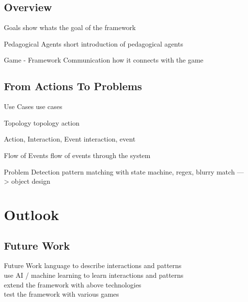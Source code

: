 \documentclass[compress]{beamer}
\begin{document}
\subsection{Overview}

\begin{frame}{Goals}
show whats the goal of the framework
\end{frame}

\begin{frame}{Pedagogical Agents}
short introduction of pedagogical agents
\end{frame}

\begin{frame}{Game - Framework Communication}
how it connects with the game
\end{frame}

\subsection{From Actions To Problems}

\begin{frame}{Use Cases}
use cases
\end{frame}

\begin{frame}{Topology}
topology action
\end{frame}

\begin{frame}{Action, Interaction, Event}
interaction, event
\end{frame}

\begin{frame}{Flow of Events}
flow of events through the system
\end{frame}

\begin{frame}{Problem Detection}
pattern matching with state machine, regex, blurry match ---> object design
\end{frame}

\section{Outlook}

\subsection{Future Work}

\begin{frame}{Future Work}
language to describe interactions and patterns\\
use AI / machine learning to learn interactions and patterns\\
extend the framework with above technologies\\
test the framework with various games
\end{frame}
\end{document}
